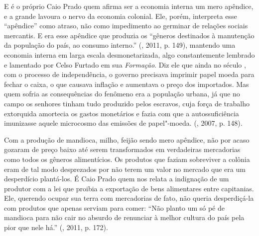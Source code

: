 {E é o próprio Caio Prado quem afirma ser a economia interna um mero
apêndice, e a grande lavoura o nervo da economia colonial. Ele, porém,
interpreta esse ``apêndice'' como atraso, não como impedimento ao
germinar de relações sociais mercantis. E era esse apêndice que produzia
os ``gêneros destinados à manutenção da população do país, ao consumo
interno.'' (, 2011, p. 149), mantendo uma economia
interna em larga escala desmonetarizada, algo constantemente lembrado e
lamentado por Celso Furtado em sua \emph{Formação}. Diz ele que ainda no
século , com o processo de independência, o governo precisava
imprimir papel moeda para fechar o caixa, o que causava inflação e
aumentava o preço dos importados. Mas quem sofria as consequências do
fenômeno era a população urbana, já que no campo os senhores tinham tudo
produzido pelos escravos, cuja força de trabalho extorquida amortecia os
gastos monetários e fazia com que a autossuficiência imunizasse aquele
microcosmo das emissões de papel"-moeda. (, 2007, p. 148).

Com a produção de mandioca, milho, feijão sendo mero apêndice, não por
acaso gozaram de preço baixo até serem transformados em verdadeiras
mercadorias como todos os gêneros alimentícios. Os produtos que faziam
sobreviver a colônia eram de tal modo desprezados por não terem um valor
no mercado que era um desperdício plantá-los. É Caio Prado quem nos
relata a indignação de um produtor com a lei que proibia a exportação de
bens alimentares entre capitanias. Ele, querendo ocupar sua terra com
mercadorias de fato, não queria desperdiçá-la com produtos que apenas
serviam para comer: ``Não planto um só pé de mandioca para não cair no
absurdo de renunciar à melhor cultura do país pela pior que nele há.''
(, 2011, p. 172).

}
